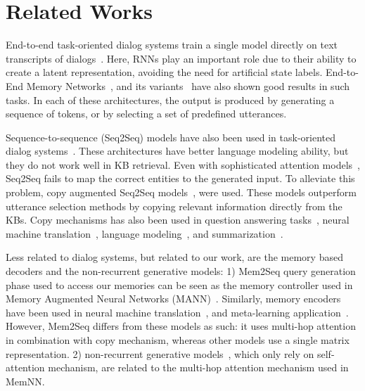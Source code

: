 \documentclass[11pt,a4paper]{article}
\begin{document}
\section{Related Works}
End-to-end task-oriented dialog systems train a single model directly on text transcripts of dialogs~\cite{wen2016network,serban2016building,williams2017hybrid,zhao2017generative, seo2016query,serban2017hierarchical}. Here, RNNs play an important role due to their ability to create a latent representation, avoiding the need for artificial state labels. End-to-End Memory Networks~\cite{bordes2016learning,sukhbaatar2015end}, and its variants~\cite{perez2016gated,wu2017dstc6,dqmem} have also shown good results in such tasks. In each of these architectures, the output is produced by generating a sequence of tokens, or by selecting a set of predefined utterances.

Sequence-to-sequence (Seq2Seq) models have also been used in task-oriented dialog systems~\cite{zhao2017generative}. These architectures have better language modeling ability, but they do not work well in KB retrieval. Even with sophisticated attention models~\cite{luong-pham-manning:2015:EMNLP,bahdanau2014neural}, Seq2Seq fails to map the correct entities to the generated input. To alleviate this problem, copy augmented Seq2Seq models~\citet{eric-manning:2017:EACLshort}, were used. These models outperform utterance selection methods by copying relevant information directly from the KBs. Copy mechanisms has also been used in question answering tasks~\cite{Dehghani:2017:LAC:3132847.3133010,he-EtAl:2017:Long1}, neural machine translation~\cite{gulcehre-EtAl:2016:P16-1,gu-EtAl:2016:P16-1}, language modeling~\cite{merity2016pointer}, and summarization~\cite{see-liu-manning:2017:Long}. 

Less related to dialog systems, but related to our work, are the memory based decoders and the non-recurrent generative models: 1) Mem2Seq query generation phase used to access our memories can be seen as the memory controller used in Memory Augmented Neural Networks (MANN)~\cite{graves2014neural,graves2016hybrid}. Similarly, memory encoders have been used in neural machine translation~\cite{wang-EtAl:2016:EMNLP20161}, and meta-learning application~\cite{DBLP:journals/corr/KaiserNRB17}. However, Mem2Seq differs from these models as such: it uses multi-hop attention in combination with copy mechanism, whereas other models use a single matrix representation. 2) non-recurrent generative models~\cite{vaswani2017attention}, which only rely on self-attention mechanism, are related to the multi-hop attention mechanism used in MemNN.
\end{document}
